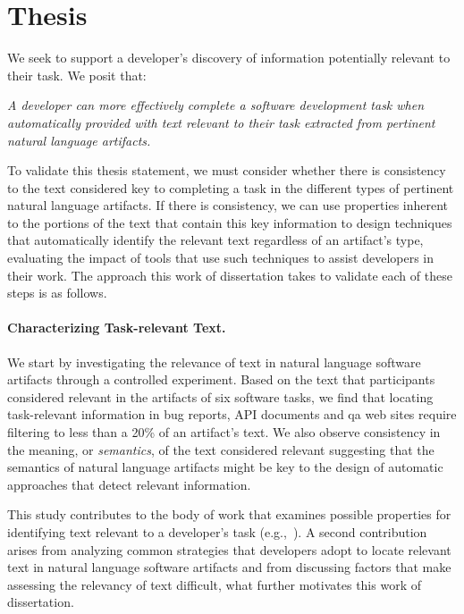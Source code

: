 

\section{Thesis}
\label{cp1:thesis}



We seek to support a developer's discovery of information potentially relevant to their task. 
We posit that:

\medskip
\begin{bluequote}
    \textit{A developer can more effectively complete a software development task when automatically provided with text relevant to their task extracted from pertinent natural language artifacts.}
\end{bluequote}
\medskip




To validate this thesis statement, 
we must consider whether there is consistency to 
the text 
considered key to completing a task
in the different types of pertinent natural language artifacts.
If there is consistency, we can use properties inherent 
to the portions of the text that contain this key information 
to design techniques that automatically identify the relevant text
regardless of an artifact's type, evaluating the impact of tools that use such techniques to assist developers in their work. 
The approach this work of dissertation takes to validate each of these steps is as follows.



\paragraph{\textbf{Characterizing Task-relevant Text.}} 


We start by investigating the relevance of text in natural language software artifacts
through a controlled experiment.
Based on the text that participants considered relevant in the artifacts of six software tasks,
we find that 
locating task-relevant information in bug
reports, API documents and \acf{qa} web sites require filtering
to less than a 20\% of an artifact's text.
We also 
observe consistency in the meaning, or \textit{semantics}, of the
 text considered relevant
 suggesting that the semantics of natural language artifacts might 
 be key to the design of automatic approaches that detect relevant information.


This study contributes to the body of work that examines possible properties for identifying text relevant to a developer's task (e.g.,~\cite{Forward2002, Jiang2016b, Robillard2015, Bavota2016}).
A second contribution arises from analyzing
common strategies that developers adopt to locate relevant text
in natural language software artifacts 
and from discussing
factors that make assessing the relevancy of text difficult,
what further motivates this work of dissertation.






